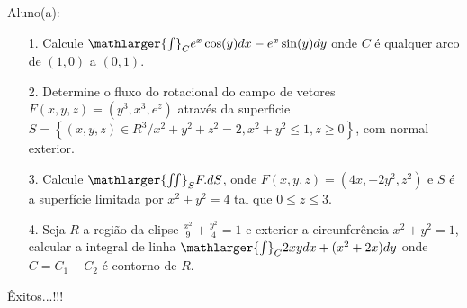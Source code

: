 \documentclass[oneside,a4paper,12pt]{article}
\begin{document}
     \begin{flushleft}
     	Aluno(a):
     \end{flushleft}
 
 \begin{itemize}
 	\item[1.] Calcule $\mathlarger{\int}_{C}e^{x}\cos(y)dx-e^{x}\sin(y)dy$ onde $C$ é qualquer arco de $(1,0)$ a $(0,1)$.
 \end{itemize}
 \begin{itemize}
 	\item[2.] Determine o fluxo do rotacional do campo de vetores $F(x,y,z)=(y^{3},x^{3},e^{z})$ através da superficie $S=\left\lbrace (x,y,z)\in R^{3} / x^{2}+y^{2}+z^{2}=2, x^{2}+y^{2}\leq 1, z\geq 0 \right\rbrace $, com normal exterior. 
 \end{itemize}
 \begin{itemize}
 	\item [3.] Calcule $\mathlarger{\iint}_{S}F.dS$, onde $F(x,y,z)=(4x,-2y^{2},z^{2})$ e $S$ é a superfície limitada por $x^{2}+y^{2}=4$ tal que $0\leq z \leq3$.
 \end{itemize}
 \begin{itemize}
 	\item[4.] Seja $R$ a região da elipse $\frac{x^{2}}{9}+\frac{y^{2}}{4}=1$ e exterior a circunferência $x^{2}+y^{2}=1$, calcular a integral de linha $\mathlarger{\int}_{C}2xydx+(x^{2}+2x)dy$ onde $C=C_{1}+C_{2}$ é contorno de $R$.
 \end{itemize}
\flushbottom
\flushright
Êxitos...!!!
\end{document}
